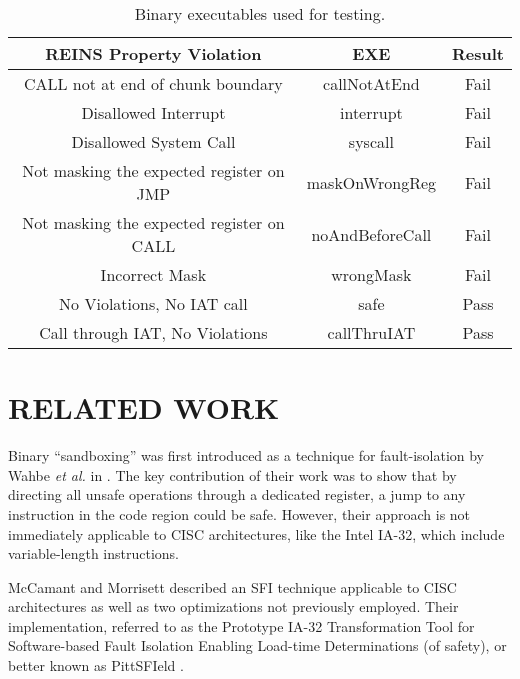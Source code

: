 \documentclass[conference]{IEEEtran}
\begin{document}
\begin{table}
\caption{Binary executables used for testing.}
\label{tab:binaryTest}
\centering
\begin{tabular}{|c|c|c|}
	\hline
	REINS Property Violation & EXE & Result \\
	\hline
	\hline

	CALL not at end of chunk boundary & callNotAtEnd & Fail \\
	\hline

	Disallowed Interrupt & interrupt & Fail \\
	\hline

	Disallowed System Call & syscall & Fail \\
	\hline

	Not masking the expected register on JMP & maskOnWrongReg & Fail \\
	\hline

	Not masking the expected register on CALL & noAndBeforeCall & Fail \\
	\hline

	Incorrect Mask  & wrongMask & Fail \\
	\hline
	
	No Violations, No IAT call & safe & Pass \\
	\hline
	
	Call through IAT, No Violations & callThruIAT & Pass \\
	\hline

\end{tabular}
\end{table}

\section{RELATED WORK}

Binary ``sandboxing'' was first introduced as a technique for fault-isolation by Wahbe \emph{et al.} in \cite{Wahbe:1993:ESF:173668.168635}. 
The key contribution of their work was to show that by directing all unsafe operations through a dedicated register, a jump to any instruction in the code region could be safe.
However, their approach is not immediately applicable to CISC architectures, like the Intel IA-32, which include variable-length instructions.

McCamant and Morrisett described an SFI technique applicable to CISC architectures as well as two optimizations not previously employed.  
Their implementation, referred to as the Prototype IA-32 Transformation Tool for Software-based Fault Isolation Enabling Load-time Determinations (of safety), or better known as PittSFIeld \cite{McCamantM06}.
\end{document}
